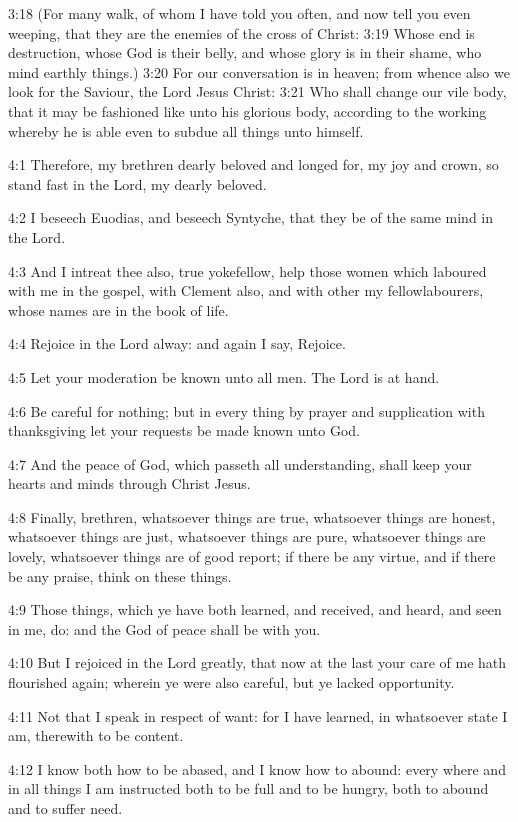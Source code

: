 3:18 (For many walk, of whom I have told you often, and now tell you even weeping, that they are the enemies of the cross of Christ: 3:19 Whose end is destruction, whose God is their belly, and whose glory is in their shame, who mind earthly things.)  3:20 For our conversation is in heaven; from whence also we look for the Saviour, the Lord Jesus Christ: 3:21 Who shall change our vile body, that it may be fashioned like unto his glorious body, according to the working whereby he is able even to subdue all things unto himself.

4:1 Therefore, my brethren dearly beloved and longed for, my joy and crown, so stand fast in the Lord, my dearly beloved.

4:2 I beseech Euodias, and beseech Syntyche, that they be of the same mind in the Lord.

4:3 And I intreat thee also, true yokefellow, help those women which laboured with me in the gospel, with Clement also, and with other my fellowlabourers, whose names are in the book of life.

4:4 Rejoice in the Lord alway: and again I say, Rejoice.

4:5 Let your moderation be known unto all men. The Lord is at hand.

4:6 Be careful for nothing; but in every thing by prayer and supplication with thanksgiving let your requests be made known unto God.

4:7 And the peace of God, which passeth all understanding, shall keep your hearts and minds through Christ Jesus.

4:8 Finally, brethren, whatsoever things are true, whatsoever things are honest, whatsoever things are just, whatsoever things are pure, whatsoever things are lovely, whatsoever things are of good report; if there be any virtue, and if there be any praise, think on these things.

4:9 Those things, which ye have both learned, and received, and heard, and seen in me, do: and the God of peace shall be with you.

4:10 But I rejoiced in the Lord greatly, that now at the last your care of me hath flourished again; wherein ye were also careful, but ye lacked opportunity.

4:11 Not that I speak in respect of want: for I have learned, in whatsoever state I am, therewith to be content.

4:12 I know both how to be abased, and I know how to abound: every where and in all things I am instructed both to be full and to be hungry, both to abound and to suffer need.

